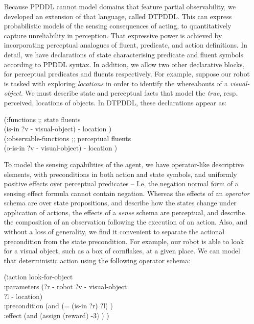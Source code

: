 \documentclass[letterpaper]{article}
\begin{document}
Because PPDDL cannot model domains that feature partial observability,
we developed an extension of that language, called DTPDDL. This can
express probabilistic models of the sensing consequences of acting, to
quantitatively capture unreliability in perception. That expressive
power is achieved by incorporating perceptual analogues of fluent,
predicate, and action definitions. In detail, we have declarations of
state characterising predicate and fluent symbols according to PPDDL
syntax. In addition, we allow two other declarative blocks, for
perceptual predicates and fluents respectively. For example, suppose our
robot is tasked with exploring {\em locations} in order to identify
the whereabouts of a {\em visual-object}. We must describe state and
perceptual facts that model the {\em true}, resp. perceived, locations
of objects. In DTPDDL, these declarations appear as:

\small{
\begin{tabtt}
(\=:functions  ;; state fluents\\
  \> (is-in ?v - visual-object) - location )\\
(:observable-functions  ;; perceptual fluents\\
  \> (o-is-in ?v - visual-object) - location )
\end{tabtt}
}

\noindent To model the sensing capabilities of the agent, we have
operator-like descriptive elements, with preconditions in both action
and state symbols, and uniformly positive effects over perceptual
predicates -- I.e, the negation normal form of a sensing effect
formula cannot contain negation. Whereas the effects of an {\em
operator} schema are over state propositions, and describe how the
states change under application of actions, the effects of a {\em
sense} schema are perceptual, and describe the composition of an
observation following the execution of an action. Also, and without a
loss of generality, we find it convenient to separate the actional
precondition from the state precondition. For example, our robot is
able to look for a visual object, such as a box of cornflakes, at a
given place. We can model that deterministic action using the
following operator schema:


\small{
\begin{tabtt}
(\=:action look-for-object \+ \\
   :parameters (\=?r - robot ?v - visual-object\\
   \> ?l - location) \\
   :precondition (and (= (is-in ?r) ?l) ) \\
   :effect (and (assign (reward) -3) ) ) \\
\end{tabtt}
}
\end{document}
